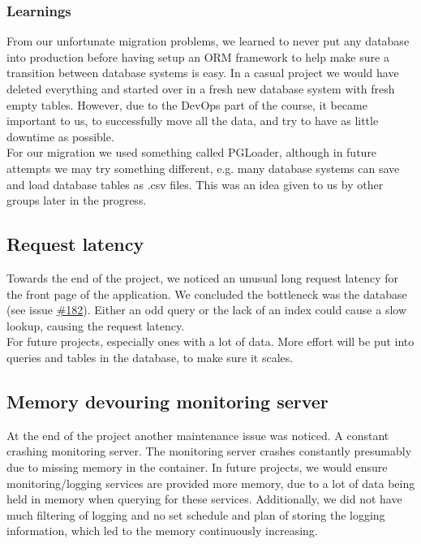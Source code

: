 \subsubsection{Learnings}
From our unfortunate migration problems, we learned to never put any database into production before having setup an ORM framework to help make sure a transition between database systems is easy. In a casual project we would have deleted everything and started over in a fresh new database system with fresh empty tables. However, due to the DevOps part of the course, it became important to us, to successfully move all the data, and try to have as little downtime as possible. \\

For our migration we used something called PGLoader\cite{pgloader}, although in future attempts we may try something different, e.g. many database systems can save and load database tables as .csv files. This was an idea given to us by other groups later in the progress.

\subsection{Request latency}
Towards the end of the project, we noticed an unusual long request latency for the front page of the application. We concluded the bottleneck was the database (see issue \href{https://github.com/DevelOpsITU/MiniTwit/issues/182}{\#182}). Either an odd query or the lack of an index could cause a slow lookup, causing the request latency.\\
For future projects, especially ones with a lot of data. More effort will be put into queries and tables in the database, to make sure it scales.

\subsection{Memory devouring monitoring server}
 At the end of the project another maintenance issue was noticed. A constant crashing monitoring server. The monitoring server crashes constantly presumably due to missing memory in the container.  %
In future projects, we would ensure monitoring/logging services are provided more memory, due to a lot of data being held in memory when querying for these services. Additionally, we did not have much filtering of logging and no set schedule and plan of storing the logging information, which led to the memory continuously increasing. 

